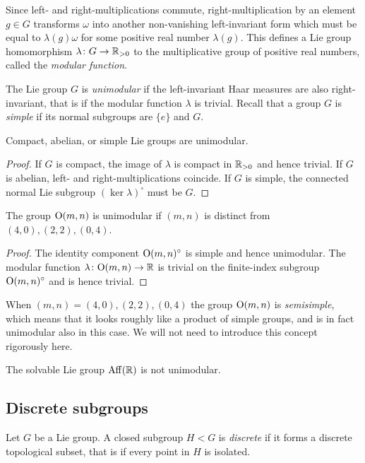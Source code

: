 Since left- and right-multiplications commute, right-multiplication by an element $g\in G$ transforms $\omega$ into another non-vanishing left-invariant form which must be equal to $\lambda(g) \omega$ for some positive real number $\lambda(g)$. This defines a Lie group homomorphism $\lambda \colon G \to \mathbb{R}_{>0}$ to the multiplicative group of positive real numbers, called the \emph{modular function}.

The Lie group $G$ is \emph{unimodular} if the left-invariant Haar measures are also right-invariant, that is if the modular function $\lambda$ is trivial. 
Recall that a group $G$ is \emph{simple} if its normal subgroups are $\{e\}$ and $G$.

\begin{prop} \label{compact:unimodular:prop}
Compact, abelian, or simple Lie groups are unimodular.
\end{prop}
\begin{proof}
If $G$ is compact, the image of $\lambda$ is compact in $\mathbb{R}_{>0}$ and hence trivial. If $G$ is abelian, left- and right-multiplications coincide. If $G$ is simple, the connected normal Lie subgroup $(\ker \lambda)^\circ$ must be $G$. 
\end{proof}

\begin{cor} \label{O:unimodular:cor}
The group ${\rm O}(m,n)$ is unimodular if $(m,n)$ is distinct from $(4,0), (2,2), (0,4)$.
\end{cor}
\begin{proof}
The identity component ${\rm O}(m,n)^\circ$ is simple and hence unimodular. The modular function $\lambda\colon {\rm O}(m,n) \to \mathbb{R}$ is trivial on the finite-index subgroup ${\rm O}(m,n)^\circ$ and is hence trivial.
\end{proof}

\begin{oss}
When $(m,n) = (4,0), (2,2), (0,4)$ the group ${\rm O}(m,n)$ is \emph{semisimple}, which means that it looks roughly like a product of simple groups, and is in fact unimodular also in this case. We will not need to introduce this concept rigorously here. 

The solvable Lie group ${\rm Aff}(\mathbb{R})$ is not unimodular.
\end{oss}

\subsection{Discrete subgroups}
Let $G$ be a Lie group. A closed subgroup $H< G$ is \emph{discrete} if it forms a discrete topological subset, that is if every point in $H$ is isolated.


